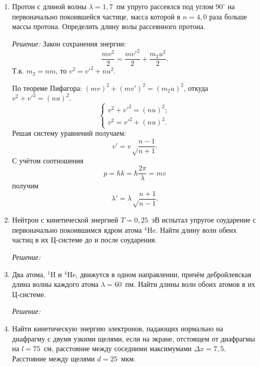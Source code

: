 \section{}
\begin{enumerate}

\item Протон с длиной волны \( \lambda = 1,\!7 \)~пм упруго рассеялся под
углом \( 90^\circ \) на первоначально покоившейся частице, масса которой в
\( n = 4,0 \) раза больше массы протона. Определить длину волы рассеянного
протона.

\emph{Решение:}
    Закон сохранения энергии: 
    \[
        \frac{mv^2}{2} = \frac{mv'^2}{2} + \frac{m_2u^2}{2}.
    \]
    Т.к. \( m_2 = nm \), то \( v^2 = v'^2 + nu^2 \).
    
    По теореме Пифагора: \( (mv)^2 + (mv')^2 = (m_2u)^2 \),
    откуда \( v^2 + v'^2 = (nu)^2 \).
    \[
        \left\{\begin{array}{l}
            v^2 + v'^2 = (nu)^2; \\
            v^2 = v'^2 + (nu)^2.
        \end{array}\right.
    \]
    Решая систему уравнений получаем:
    \[
        v' = v\sqrt\frac{n-1}{n+1}.
    \]
    С учётом соотношения
    \[
        p = \hbar k = \hbar\frac{2\pi}{\lambda} = mv
    \]
    получим
    \[
        \lambda' = \lambda\sqrt\frac{n+1}{n-1}.
    \]

\newpage

\item Нейтрон с кинетической энергией \( T = 0,\!25 \)~эВ испытал упругое
соударение с первоначально покоившимся ядром атома \( ^4\mathrm{He} \). Найти
длину волн обеих частиц в их Ц-системе до и после соударения.

\emph{Решение:}

\newpage

\item Два атома, \( ^1\mathrm{H} \) и \( ^4\mathrm{He} \), движутся в одном
направлении, причём дебройлевская длина волны каждого атома
\( \lambda = 60 \)~пм. Найти длины волн обоих атомов в их Ц-системе.

\emph{Решение:}

\newpage

\item Найти кинетическую энергию электронов, падающих нормально на диафрагму с
двумя узкими щелями, если на экране, отстоящем от диафрагмы на \( l = 75 \)~см,
расстояние между соседними максимумами \( \Delta x = 7,\!5 \). Расстояние между
щелями \( d = 25 \)~мкм.


\end{enumerate}
